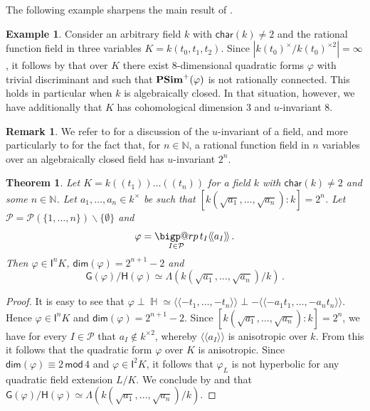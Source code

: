 \documentclass[twoside,11pt]{amsart}
\makeatletter
\numberwithin{equation}{section}
\newtheorem{thm}[equation]{Theorem}
\theoremstyle{definition}
\newtheorem{ex}[equation]{Example}
\newtheorem{rem}[equation]{Remark}
\renewcommand{\dim}{\operatorname{\mathsf{dim}}}
\renewcommand{\bmod}{\operatorname{\,\,\mathsf{mod}}\,\,}
\newcommand\hh{\operatorname{\mathbb{H}}}
\newcommand{\car}{\mathsf{char}}
\newcommand{\vf}{\varphi}
\newcommand{\mg}[1]{{#1}^{\times}}
\newcommand{\sq}[1]{{#1}^{\times 2}}
\newcommand{\scg}[1]{\mg{#1}/\sq{#1}}
\newcommand{\nat}{\mathbb{N}}
\newcommand{\la}{\langle}
\newcommand{\ra}{\rangle}
\newcommand{\lla}{\la\!\la}
\newcommand{\rra}{\ra\!\ra}
\newcommand{\I}{\mathsf{I}}
\newcommand{\mc}{\mathcal}
\newcommand{\G}{\mathsf{G}}
\renewcommand{\H}{\mathsf{H}}
\renewcommand{\setminus}{\smallsetminus}
\renewcommand{\dim}{\mathsf{dim}}
\renewcommand{\bmod}{\,\mathsf{mod}\,}
\renewcommand{\setminus}{\smallsetminus}
\newcommand{\bigperp}{%
  \mathop{\mathpalette\bigp@rp\relax}%
  \displaylimits
}
\newcommand{\bigp@rp}[2]{%
  \vcenter{
    \m@th\hbox{\scalebox{\ifx#1\displaystyle2.1\else1.5\fi}{$#1\perp$}}
  }%
}
\makeatother
\begin{document}
The following example sharpens the main result of \cite{Gil97}.

\begin{ex}\label{Gille-cd3examples-simplified}
    Consider an arbitrary field $k$ with $\car(k)\neq 2$ and the rational function field in three variables $K=k(t_0,t_1,t_2)$.
    Since $|\scg{k(t_0)}|=\infty$, it follows by  that  over $K$ there exist $8$-dimensional quadratic forms $\vf$ with trivial discriminant and such that ${\bf PSim}^+(\vf)$ is not rationally connected.
    This holds in particular when $k$ is algebraically closed.
    In that situation, however, we have additionally that 
    $K$ has cohomological dimension $3$ and $u$-invariant $8$.
\end{ex}

\begin{rem}\label{u}
    We refer to \cite[Chap.~8]{Pfi95} for a discussion of the $u$-invariant of a field, and more particularly to \cite[Chap.~8, Ex.~1.2 (6)]{Pfi95} for the fact that, for $n\in\nat$, a rational function field in $n$ variables over an algebraically closed field has $u$-invariant $2^n$.
\end{rem}
    
\begin{thm}\label{In-fork-construction}
    Let 
    $K=k(\!(t_1)\!)\ldots(\!(t_n)\!)$ for a field $k$ with $\car(k)\neq 2$ and some $n\in\nat$.
    Let $a_1,\dots,a_
    n\in\mg{k}$ be such that $[k(\sqrt{a_1},\dots,\sqrt{a_n}):k]=2^n$.
    Let $\mc{P}=\mc{P}(\{1,\dots,n\})\setminus\{\emptyset\}$ and 
    $$\varphi=\bigperp_{I\in \mc{P}}  t_I\lla a_I\rra\,.$$
    Then $\varphi\in\I^nK$, $\dim(\varphi)=2^{n+1}-2$ and $$\G(\varphi)/\H(\varphi)\simeq \Lambda(k(\sqrt{a_1},\dots,\sqrt{a_n})/k)\,.$$
\end{thm}
\begin{proof}
     It is easy to see that $\varphi\perp\hh\simeq \lla -t_1,\dots,-t_n\rra\perp - \lla -a_1t_1,\dots,-a_nt_n\rra$. Hence 
    $\varphi\in\I^nK$ and $\dim(\varphi)=2^{n+1}-2$.
    Since $[k(\sqrt{a_1},\dots,\sqrt{a_n}):k]=2^n$, we have for every $I\in\mc{P}$ that 
    $a_I\notin\sq{k}$, whereby $\lla a_I\rra$ is anisotropic over $k$.
    From this it follows that the quadratic form $\vf$ over $K$ is anisotropic.
    Since $\dim(\varphi)\equiv 2\bmod 4$ and $\varphi\in\I^2K$, it follows that $\varphi_L$ is not hyperbolic for any quadratic field extension $L/K$.
    We conclude by  and  that $\G(\varphi)/\H(\varphi)\simeq \Lambda(k(\sqrt{a_1},\dots,\sqrt{a_n})/k)$.
\end{proof}
\end{document}
